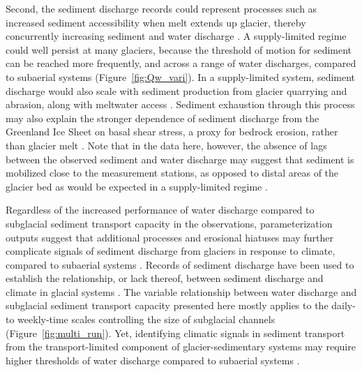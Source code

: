 \documentclass[11pt]{article}
\begin{document}
Second, the sediment discharge records could represent processes such as increased sediment accessibility when melt extends up glacier, thereby concurrently increasing sediment and water discharge \citep[e.g.][]{vergara2022}.
A supply-limited regime could well persist at many glaciers, because the threshold of motion for sediment can be reached more frequently, and across a range of water discharges, compared to subaerial systems (Figure~\ref{fig:Qw_vari}).
In a supply-limited system, sediment discharge would also scale with sediment production from glacier quarrying and abrasion, along with meltwater access \citep[e.g.][]{herman2015,ugelvig2018,delaney2023}.
Sediment exhaustion through this process may also explain the stronger dependence of sediment discharge from the Greenland Ice Sheet on basal shear stress, a proxy for bedrock erosion, rather than glacier melt \citep{overeem2017}.
Note that in the data here, however, the absence of lags between the observed sediment and water discharge may suggest that sediment is mobilized close to the measurement stations, as opposed to distal areas of the glacier bed as would be expected in a supply-limited regime \citep[Figure~\ref{fig:model_outs}\, a and e; ][]{williams1989}.



Regardless of the increased performance of water discharge compared to subglacial sediment transport capacity in the observations, parameterization outputs suggest that additional processes and erosional hiatuses may further complicate signals of sediment discharge from glaciers in response to climate, compared to subaerial systems \citep{jansson2005,ganti2016}.
Records of sediment discharge have been used to establish the relationship, or lack thereof, between sediment discharge and climate in glacial systems \citep[e.g.][]{koppes2009a,willenbring2016,mariotti2021}.
The variable relationship between water discharge and subglacial sediment transport capacity presented here mostly applies to the daily- to weekly-time scales controlling the size of subglacial channels (Figure~\ref{fig:multi_run}).
Yet, identifying climatic signals in sediment transport from the transport-limited component of glacier-sedimentary systems may require higher thresholds of water discharge compared to subaerial systems \citep[Figure~\ref{fig:Qw_vari}; ][]{tofelde2021}.
\end{document}
